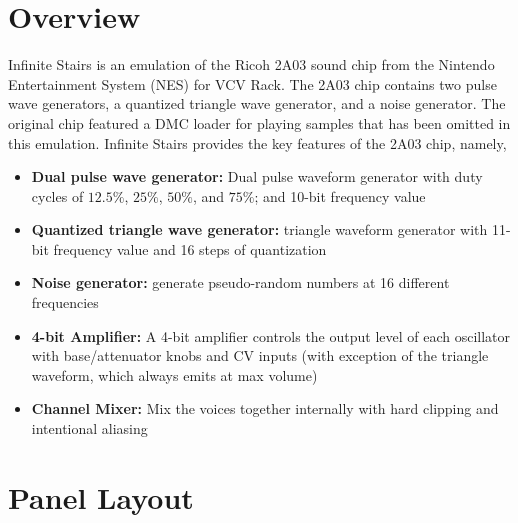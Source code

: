 \documentclass[12pt,letter]{article}
\begin{document}


\section*{Overview}

Infinite Stairs is an emulation of the Ricoh 2A03 sound chip from the Nintendo Entertainment System (NES) for VCV Rack. The 2A03 chip contains two pulse wave generators, a quantized triangle wave generator, and a noise generator. The original chip featured a DMC loader for playing samples that has been omitted in this emulation. Infinite Stairs provides the key features of the 2A03 chip, namely,
\begin{itemize}
  \item \textbf{Dual pulse wave generator:} Dual pulse waveform generator with duty cycles of $12.5\%$, $25\%$, $50\%$, and $75\%$; and 10-bit frequency value
  \item \textbf{Quantized triangle wave generator:} triangle waveform generator with 11-bit frequency value and 16 steps of quantization
  \item \textbf{Noise generator:} generate pseudo-random numbers at 16 different frequencies
  \item \textbf{4-bit Amplifier:} A 4-bit amplifier controls the output level of each oscillator with base/attenuator knobs and CV inputs (with exception of the triangle waveform, which always emits at max volume)
  \item \textbf{Channel Mixer:} Mix the voices together internally with hard clipping and intentional aliasing
\end{itemize}


\clearpage
\section*{Panel Layout}
\end{document}
